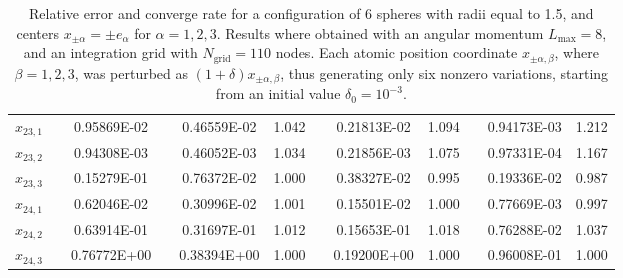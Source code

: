 \begin{table}[t]
\begin{center}
\begin{tabular}{ @{}cccc  cccc  cccc @{} }
$ x_{23,1}$  && 0.95869E-02 &&  0.46559E-02 &   1.042  && 0.21813E-02 &   1.094 && 0.94173E-03  &   1.212 \\
$ x_{23,2}$  && 0.94308E-03 &&  0.46052E-03 &   1.034  && 0.21856E-03 &   1.075 && 0.97331E-04  &   1.167 \\
$ x_{23,3}$  && 0.15279E-01 &&  0.76372E-02 &   1.000  && 0.38327E-02 &   0.995 && 0.19336E-02  &   0.987 \\
$ x_{24,1}$  && 0.62046E-02 &&  0.30996E-02 &   1.001  && 0.15501E-02 &   1.000 && 0.77669E-03  &   0.997 \\
$ x_{24,2}$  && 0.63914E-01 &&  0.31697E-01 &   1.012  && 0.15653E-01 &   1.018 && 0.76288E-02  &   1.037 \\
$ x_{24,3}$  && 0.76772E+00 &&  0.38394E+00 &   1.000  && 0.19200E+00 &   1.000 && 0.96008E-01  &   1.000 \\
\bottomrule[0.1em]
\end{tabular}
\caption{Relative error and converge rate for a configuration of 6 spheres with radii equal to 1.5, and centers $x_{\pm \alpha} =  \pm e_\alpha$ for $\alpha = 1, 2,3$.  Results where obtained with an angular momentum $L_\text{max} =  8$, and an integration grid with $N_\text{grid} = 110$ nodes. Each atomic position coordinate $x_{\pm\alpha,\beta}$, where $\beta = 1,2,3$, was perturbed as $(1 + \delta)x_{\pm\alpha , \beta}$, thus generating only six nonzero variations, starting from an initial value $\delta_0 = 10^{-3}$.}\label{tab:2}
\end{center}
\end{table}
